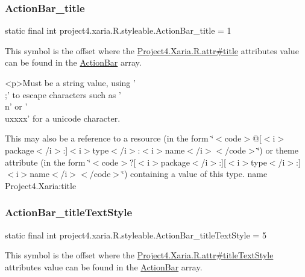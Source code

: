 \subsubsection{\texorpdfstring{Action\+Bar\+\_\+title}{ActionBar\_title}}
{\footnotesize\ttfamily static final int project4.\+xaria.\+R.\+styleable.\+Action\+Bar\+\_\+title = 1\hspace{0.3cm}{\ttfamily [static]}}

This symbol is the offset where the \hyperlink{}{Project4.\+Xaria.\+R.\+attr\#title} attribute\textquotesingle{}s value can be found in the \hyperlink{classproject4_1_1xaria_1_1R_1_1styleable_accb530194c58ee3abb15587da8869e99}{Action\+Bar} array.

\begin{DoxyVerb}      <p>Must be a string value, using '\\;' to escape characters such as '\\n' or '\\uxxxx' for a unicode character.
\end{DoxyVerb}
 

This may also be a reference to a resource (in the form \char`\"{}$<$code$>$@\mbox{[}$<$i$>$package$<$/i$>$\+:\mbox{]}$<$i$>$type$<$/i$>$\+:$<$i$>$name$<$/i$>$$<$/code$>$\char`\"{}) or theme attribute (in the form \char`\"{}$<$code$>$?\mbox{[}$<$i$>$package$<$/i$>$\+:\mbox{]}\mbox{[}$<$i$>$type$<$/i$>$\+:\mbox{]}$<$i$>$name$<$/i$>$$<$/code$>$\char`\"{}) containing a value of this type.  name Project4.\+Xaria\+:title \mbox{\label{classproject4_1_1xaria_1_1R_1_1styleable_a981a219de0af41bb112ba02e0268fb0b}} 
\subsubsection{\texorpdfstring{Action\+Bar\+\_\+title\+Text\+Style}{ActionBar\_titleTextStyle}}
{\footnotesize\ttfamily static final int project4.\+xaria.\+R.\+styleable.\+Action\+Bar\+\_\+title\+Text\+Style = 5\hspace{0.3cm}{\ttfamily [static]}}

This symbol is the offset where the \hyperlink{}{Project4.\+Xaria.\+R.\+attr\#title\+Text\+Style} attribute\textquotesingle{}s value can be found in the \hyperlink{classproject4_1_1xaria_1_1R_1_1styleable_accb530194c58ee3abb15587da8869e99}{Action\+Bar} array.

